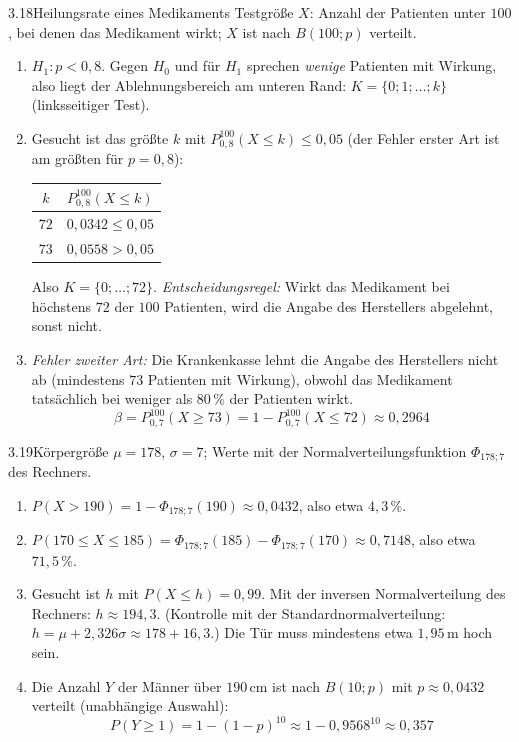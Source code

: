 \begin{loesung}{3.18}{Heilungsrate eines Medikaments}
Testgröße $X$: Anzahl der Patienten unter $100$, bei denen das Medikament wirkt; $X$ ist nach $B(100;p)$ verteilt.
\begin{enumerate}[label=\alph*)]
  \item $H_1: p<0{,}8$. Gegen $H_0$ und für $H_1$ sprechen \emph{wenige} Patienten mit Wirkung, also liegt der Ablehnungsbereich am unteren Rand: $K = \{0;1;\ldots;k\}$ (linksseitiger Test).
  \item Gesucht ist das größte $k$ mit $P^{100}_{0{,}8}(X\leq k)\leq 0{,}05$ (der Fehler erster Art ist am größten für $p=0{,}8$):
  \begin{center}\begin{tabular}{|c|c|}
    \hline
    $k$ & $P^{100}_{0{,}8}(X\leq k)$\\
    \hline
    $72$ & $0{,}0342\leq 0{,}05$\\
    \hline
    $73$ & $0{,}0558>0{,}05$\\
    \hline
  \end{tabular}\end{center}
  Also $K = \{0;\ldots;72\}$. \textit{Entscheidungsregel:} Wirkt das Medikament bei höchstens $72$ der $100$ Patienten, wird die Angabe des Herstellers abgelehnt, sonst nicht.
  \item \textit{Fehler zweiter Art:} Die Krankenkasse lehnt die Angabe des Herstellers nicht ab (mindestens $73$ Patienten mit Wirkung), obwohl das Medikament tatsächlich bei weniger als $80\,\%$ der Patienten wirkt.
  \[\beta = P^{100}_{0{,}7}(X\geq 73) = 1-P^{100}_{0{,}7}(X\leq 72)\approx 0{,}2964\]
\end{enumerate}
\end{loesung}

\begin{loesung}{3.19}{Körpergröße}
$\mu = 178$, $\sigma = 7$; Werte mit der Normalverteilungsfunktion $\Phi_{178;7}$ des Rechners.
\begin{enumerate}[label=\alph*)]
  \item $P(X>190) = 1-\Phi_{178;7}(190)\approx 0{,}0432$, also etwa $4{,}3\,\%$.
  \item $P(170\leq X\leq 185) = \Phi_{178;7}(185)-\Phi_{178;7}(170)\approx 0{,}7148$, also etwa $71{,}5\,\%$.
  \item Gesucht ist $h$ mit $P(X\leq h) = 0{,}99$. Mit der inversen Normalverteilung des Rechners: $h\approx 194{,}3$. (Kontrolle mit der Standardnormalverteilung: $h = \mu+2{,}326\sigma\approx 178+16{,}3$.) Die Tür muss mindestens etwa $1{,}95\,\text{m}$ hoch sein.
  \item Die Anzahl $Y$ der Männer über $190\,\text{cm}$ ist nach $B(10;p)$ mit $p\approx 0{,}0432$ verteilt (unabhängige Auswahl):
  \[P(Y\geq 1) = 1-(1-p)^{10}\approx 1-0{,}9568^{10}\approx 0{,}357\]
\end{enumerate}
\end{loesung}

